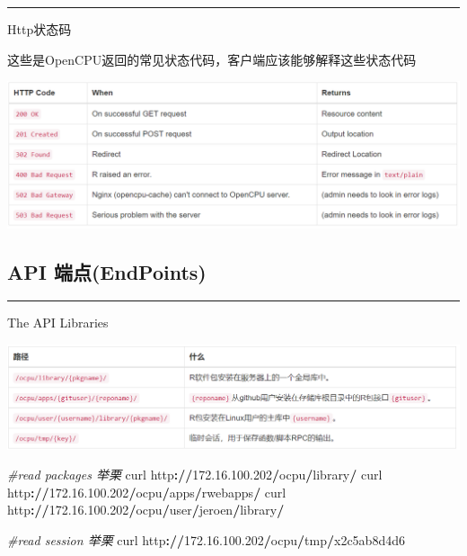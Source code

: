 \documentclass[]{book}
\newenvironment{Shaded}{\begin{snugshade}}{\end{snugshade}}
\newcommand{\FloatTok}[1]{\textcolor[rgb]{0.00,0.00,0.81}{#1}}
\newcommand{\CommentTok}[1]{\textcolor[rgb]{0.56,0.35,0.01}{\textit{#1}}}
\newcommand{\OperatorTok}[1]{\textcolor[rgb]{0.81,0.36,0.00}{\textbf{#1}}}
\newcommand{\ErrorTok}[1]{\textcolor[rgb]{0.64,0.00,0.00}{\textbf{#1}}}
\newcommand{\NormalTok}[1]{#1}
\begin{document}
\begin{center}\rule{0.5\linewidth}{\linethickness}\end{center}

Http状态码

这些是OpenCPU返回的常见状态代码，客户端应该能够解释这些状态代码

\includegraphics{pic/opencpu/p2.png}

\subsection{API 端点(EndPoints)}\label{api-endpoints}

\begin{center}\rule{0.5\linewidth}{\linethickness}\end{center}

The API Libraries

\includegraphics{pic/opencpu/p3.png}

\begin{Shaded}
\begin{Highlighting}[]
\CommentTok{#read packages 举栗}
\NormalTok{curl http}\OperatorTok{:}\ErrorTok{//}\FloatTok{172.16}\NormalTok{.}\FloatTok{100.202}\OperatorTok{/}\NormalTok{ocpu}\OperatorTok{/}\NormalTok{library}\OperatorTok{/}
\NormalTok{curl http}\OperatorTok{:}\ErrorTok{//}\FloatTok{172.16}\NormalTok{.}\FloatTok{100.202}\OperatorTok{/}\NormalTok{ocpu}\OperatorTok{/}\NormalTok{apps}\OperatorTok{/}\NormalTok{rwebapps}\OperatorTok{/}
\NormalTok{curl http}\OperatorTok{:}\ErrorTok{//}\FloatTok{172.16}\NormalTok{.}\FloatTok{100.202}\OperatorTok{/}\NormalTok{ocpu}\OperatorTok{/}\NormalTok{user}\OperatorTok{/}\NormalTok{jeroen}\OperatorTok{/}\NormalTok{library}\OperatorTok{/}

\CommentTok{#read session 举栗}
\NormalTok{curl http}\OperatorTok{:}\ErrorTok{//}\FloatTok{172.16}\NormalTok{.}\FloatTok{100.202}\OperatorTok{/}\NormalTok{ocpu}\OperatorTok{/}\NormalTok{tmp}\OperatorTok{/}\NormalTok{x2c5ab8d4d6}
\end{Highlighting}
\end{Shaded}
\end{document}
